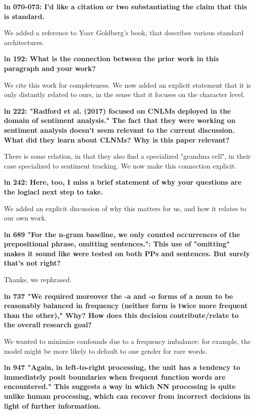 \documentclass{article}[11pt,a4paper,oneside]
\begin{document}
\textbf{ln 070-073: I'd like a citation or two substantiating the claim that this is
standard.}

We added a reference to Yoav Goldberg's book, that describes various standard architectures.\newline

\textbf{ln 192: What is the connection between the prior work in this paragraph and
your work?}

 We cite this work for completeness. We now added an explicit statement that it is only distantly related to ours, in the sense that it focuses on the character level.\newline

\textbf{ln 222: "Radford et al. (2017) focused on CNLMs deployed in the domain of
sentiment analysis." The fact that they were working on sentiment analysis
doesn't seem relevant to the current discussion. What did they learn about
CLNMs? Why is this paper relevant?}

There is some relation, in that they also find a specialized "grandma cell", in their case specialized to sentiment tracking. We now make this connection explicit.\newline

\textbf{ln 242: Here, too, I miss a brief statement of why your questions are the
logiacl next step to take.}

We added an explicit discussion of why this matters for us, and how it relates to our own work.\newline

\textbf{ln 689 "For the n-gram baseline, we only counted occurrences of the
prepositional phrase, omitting sentences.": This use of "omitting" makes it
sound like were tested on both PPs and sentences. But surely that's not
right?}

Thanks, we rephrased.\newline

\textbf{ln 737 "We required moreover the -a and -o forms of a noun to be reasonably
balanced in frequency (neither form is twice more frequent than the other),"
Why? How does this decision contribute/relate to the overall research goal?}

We wanted to minimize confounds due to a frequency imbalance: for example, the model might be more likely to default to one gender for rare words.\newline

\textbf{ln 947 "Again, in left-to-right processing, the unit has a tendency to
immediately posit boundaries when frequent function words are encountered."
This suggests a way in which NN processing is quite unlike human processing,
which can recover from incorrect decisions in light of further information.}
\end{document}
